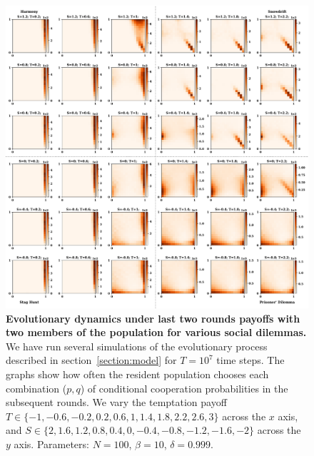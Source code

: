 \documentclass[11pt]{article}
\theoremstyle{plainCl1}
\theoremstyle{plainCl2}
\begin{document}
\begin{figure}[!htbp]
  \centering
  \includegraphics[width=\textwidth]{static/merged_plot_rounds_opponents_two.pdf}
  \caption{{\bf Evolutionary dynamics under last two rounds payoffs with two members of the population for various social dilemmas.} 
  We have run several simulations of the evolutionary process described in
  section~\ref{section:model} for $T\!=\!10^7$ time steps. The graphs show how
  often the resident population chooses each combination ($p,q$) of conditional
  cooperation probabilities in the subsequent rounds. We vary the temptation
  payoff \(T \in \{-1, -0.6, -0.2,  0.2, 0.6, 1, 1.4, 1.8, 2.2, 2.6, 3\}\)
  across the \(x\) axis, and  \(S \in \{2, 1.6, 1.2, 0.8, 0.4, 0, -0.4, -0.8,
  -1.2, -1.6, -2\}\) across the \(y\) axis. Parameters: $N\!=\!100$,
  $\beta\!=\!10$, $\delta\!=\!0.999$.}
  \label{fig:last_two_rounds_two_opponents}
\end{figure}
\end{document}
